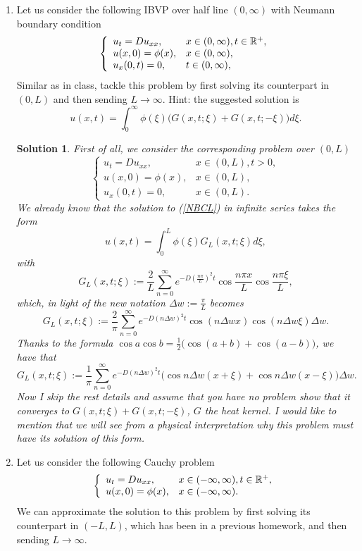 \documentclass[6pt]{article}
\newtheorem{solution}{Solution}
\numberwithin{equation}{section}
\def\mathbb{\Bbb}
\begin{document}
\begin{enumerate}
\item  Let us consider the following IBVP over half line $(0,\infty)$ with Neumann boundary condition
\begin{equation}\label{NBC}
\left\{
\begin{array}{ll}
u_t=D u_{xx},& x\in (0,\infty), t\in\mathbb R^+,\\
u(x,0)=\phi(x),&x \in (0,\infty),\\
u_x(0,t)=0,&t\in(0,\infty),
\end{array}
\right.
\end{equation}
Similar as in class, tackle this problem by first solving its counterpart in $(0,L)$ and then sending $L\rightarrow\infty$.  Hint: the suggested solution is
\[u(x,t)=\int_0^\infty \phi(\xi)\Big(G(x,t;\xi)+G(x,t;-\xi)\Big)d\xi.\]
\begin{solution}
First of all, we consider the corresponding problem over $(0,L)$
\begin{equation}\label{NBCL}
\left\{
\begin{array}{ll}
u_t=D u_{xx},& x\in (0,L), t>0,\\
u(x,0)=\phi(x),&x \in (0,L),\\
u_x(0,t)=0,&x\in(0,L).
\end{array}
\right.
\end{equation}
We already know that the solution to (\ref{NBCL}) in infinite series takes the form
\[u(x,t)=\int_0^L \phi(\xi)G_L(x,t;\xi)d\xi,\]
with
\[G_L(x,t;\xi):=\frac{2}{L}\sum_{n=0}^\infty e^{-D(\frac{n\pi}{L})^2t}\cos \frac{n\pi x}{L}\cos \frac{n\pi \xi}{L},\]
which, in light of the new notation $\Delta w:=\frac{\pi}{L}$ becomes
\[G_L(x,t;\xi):=\frac{2}{\pi}\sum_{n=0}^\infty e^{-D(n\Delta w)^2t}\cos (n \Delta w x) \cos (n\Delta w \xi) \Delta w.\]
Thanks to the formula $\cos a \cos b=\frac{1}{2}\big(\cos (a+b)+\cos (a-b)\big)$, we have that
\[G_L(x,t;\xi):=\frac{1}{\pi}\sum_{n=0}^\infty e^{-D(n\Delta w)^2t}\Big(\cos n \Delta w (x+\xi)+\cos n \Delta w (x-\xi)\Big)\Delta w.\]
Now I skip the rest details and assume that you have no problem show that it converges to $G(x,t;\xi)+G(x,t;-\xi)$, $G$ the heat kernel.  I would like to mention that we will see from a physical interpretation why this problem must have its solution of this form.
\end{solution}


\item  Let us consider the following Cauchy problem
\begin{equation}\label{infty}
\left\{
\begin{array}{ll}
u_t=D u_{xx},& x\in (-\infty,\infty), t\in\mathbb R^+,\\
u(x,0)=\phi(x),&x \in (-\infty,\infty).
\end{array}
\right.
\end{equation}
We can approximate the solution to this problem by first solving its counterpart in $(-L,L)$, which has been in a previous homework, and then sending $L\rightarrow\infty$.


\end{enumerate}
\end{document}
